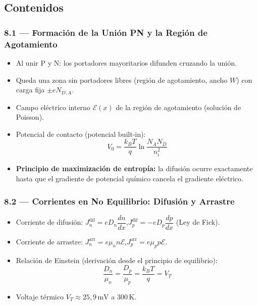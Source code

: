 \documentclass[11pt, letterpaper]{article}
\begin{document}
\subsection{Contenidos}

\subsubsection{8.1 — Formación de la Unión PN y la Región de Agotamiento}
\begin{itemize}
  \item Al unir P y N: los portadores mayoritarios difunden cruzando la unión.
  \item Queda una zona sin portadores libres (región de agotamiento, ancho $W$) con carga fija $\pm eN_{D,A}$.
  \item Campo eléctrico interno $\mathcal{E}(x)$ de la región de agotamiento (solución de Poisson).
  \item Potencial de contacto (potencial built-in):
    \[V_0 = \frac{k_BT}{q}\ln\frac{N_A N_D}{n_i^2}\]
  \item \textbf{Principio de maximización de entropía:} la difusión ocurre exactamente hasta que el gradiente de potencial químico cancela el gradiente eléctrico.
\end{itemize}

\subsubsection{8.2 — Corrientes en No Equilibrio: Difusión y Arrastre}
\begin{itemize}
  \item Corriente de difusión: $J_n^{\text{dif}}=eD_n\dfrac{dn}{dx}$,\quad$J_p^{\text{dif}}=-eD_p\dfrac{dp}{dx}$ (Ley de Fick).
  \item Corriente de arrastre: $J_n^{\text{arr}}=e\mu_n n\mathcal{E}$,\quad$J_p^{\text{arr}}=e\mu_p p\mathcal{E}$.
  \item Relación de Einstein (derivación desde el principio de equilibrio):
    \[\frac{D_n}{\mu_n}=\frac{D_p}{\mu_p}=\frac{k_BT}{q}=V_T\]
  \item Voltaje térmico $V_T\approx 25{,}9\,\text{mV}$ a $300\,\text{K}$.
\end{itemize}
\end{document}
